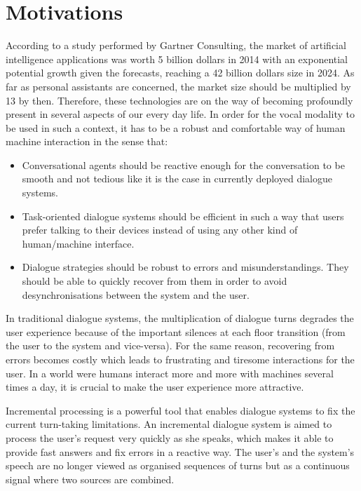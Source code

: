 \section*{Motivations}

				According to a study performed by Gartner Consulting, the market of artificial intelligence applications was worth 5 billion dollars in 2014 with an exponential potential growth given the forecasts, reaching a 42 billion dollars size in 2024. As far as personal assistants are concerned, the market size should be multiplied by 13 by then. Therefore, these technologies are on the way of becoming profoundly present in several aspects of our every day life. In order for the vocal modality to be used in such a context, it has to be a robust and comfortable way of human machine interaction in the sense that:
				
				\begin{itemize}
					\item Conversational agents should be reactive enough for the conversation to be smooth and not tedious like it is the case in currently deployed dialogue systems.
					\item Task-oriented dialogue systems should be efficient in such a way that users prefer talking to their devices instead of using any other kind of human/machine interface.
					\item Dialogue strategies should be robust to errors and misunderstandings. They should be able to quickly recover from them in order to avoid desynchronisations between the system and the user.
				\end{itemize}
				
				In traditional dialogue systems, the multiplication of dialogue turns degrades the user experience because of the important silences at each floor transition (from the user to the system and vice-versa). For the same reason, recovering from errors becomes costly which leads to frustrating and tiresome interactions for the user. In a world were humans interact more and more with machines several times a day, it is crucial to make the user experience more attractive.
				
				Incremental processing is a powerful tool that enables dialogue systems to fix the current turn-taking limitations. An incremental dialogue system is aimed to process the user's request very quickly as she speaks, which makes it able to provide fast answers and fix errors in a reactive way. The user's and the system's speech are no longer viewed as organised sequences of turns but as a continuous signal where two sources are combined.
				
